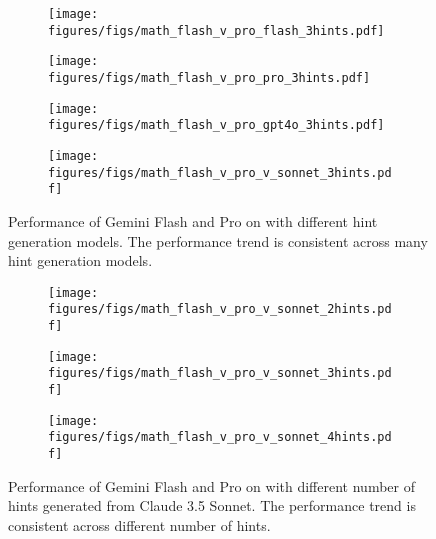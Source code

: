 \begin{figure}[h]%
\centering
\begin{subfigure}{0.24\linewidth}
\centering
\texttt{[image: figures/figs/math\_flash\_v\_pro\_flash\_3hints.pdf]}%
\end{subfigure}\hfill%
\begin{subfigure}{0.24\linewidth}
\centering
\texttt{[image: figures/figs/math\_flash\_v\_pro\_pro\_3hints.pdf]}%
\end{subfigure}\hfill%
\begin{subfigure}{0.24\linewidth}
\centering
\texttt{[image: figures/figs/math\_flash\_v\_pro\_gpt4o\_3hints.pdf]}%
\end{subfigure}\hfill%
\begin{subfigure}{0.24\linewidth}
\centering
\texttt{[image: figures/figs/math\_flash\_v\_pro\_v\_sonnet\_3hints.pdf]}%
\end{subfigure}\hfill%
\caption{Performance of Gemini Flash and Pro on \MATHAdv with different hint generation models. The performance trend is consistent across many hint generation models.}
\label{fig:math_different_hint_models}
\end{figure}


\begin{figure}[h]%
\centering
\begin{subfigure}{0.3\linewidth}
\centering
\texttt{[image: figures/figs/math\_flash\_v\_pro\_v\_sonnet\_2hints.pdf]}%
\end{subfigure}\hfill%
\begin{subfigure}{0.3\linewidth}
\centering
\texttt{[image: figures/figs/math\_flash\_v\_pro\_v\_sonnet\_3hints.pdf]}%
\end{subfigure}\hfill%
\begin{subfigure}{0.3\linewidth}
\centering
\texttt{[image: figures/figs/math\_flash\_v\_pro\_v\_sonnet\_4hints.pdf]}%
\end{subfigure}\hfill%
\caption{\small 
Performance of Gemini Flash and Pro on \MATHAdv with different number of hints generated from Claude 3.5 Sonnet. The performance trend is consistent across different number of hints.}
\label{fig:math_different_number_hints}
\end{figure}



